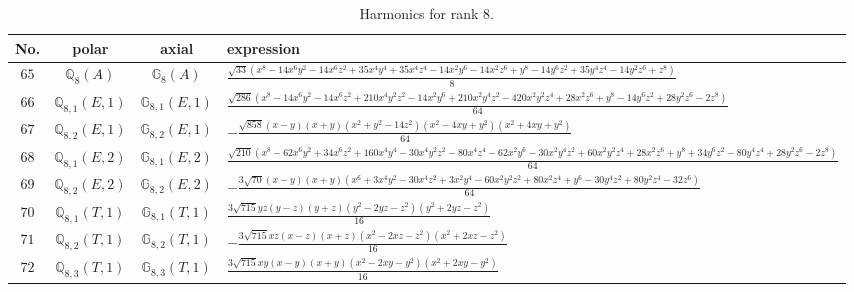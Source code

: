 \documentclass[fleqn,8pt,landscape]{jsarticle}
\begin{document}
\begin{table}[ht!]
\begin{center}
\caption{Harmonics for rank 8.}
\renewcommand{\arraystretch}{1.3}
\begin{tabular}{cccl} \hline \hline
No. & polar & axial & expression \\ \hline
$ 65 $ & $ \mathbb{Q}_{8}(A) $ & $ \mathbb{G}_{8}(A) $ & $ \frac{\sqrt{33} \left(x^{8} - 14 x^{6} y^{2} - 14 x^{6} z^{2} + 35 x^{4} y^{4} + 35 x^{4} z^{4} - 14 x^{2} y^{6} - 14 x^{2} z^{6} + y^{8} - 14 y^{6} z^{2} + 35 y^{4} z^{4} - 14 y^{2} z^{6} + z^{8}\right)}{8} $ \\
$ 66 $ & $ \mathbb{Q}_{8,1}(E,1) $ & $ \mathbb{G}_{8,1}(E,1) $ & $ \frac{\sqrt{286} \left(x^{8} - 14 x^{6} y^{2} - 14 x^{6} z^{2} + 210 x^{4} y^{2} z^{2} - 14 x^{2} y^{6} + 210 x^{2} y^{4} z^{2} - 420 x^{2} y^{2} z^{4} + 28 x^{2} z^{6} + y^{8} - 14 y^{6} z^{2} + 28 y^{2} z^{6} - 2 z^{8}\right)}{64} $ \\
$ 67 $ & $ \mathbb{Q}_{8,2}(E,1) $ & $ \mathbb{G}_{8,2}(E,1) $ & $ - \frac{\sqrt{858} \left(x - y\right) \left(x + y\right) \left(x^{2} + y^{2} - 14 z^{2}\right) \left(x^{2} - 4 x y + y^{2}\right) \left(x^{2} + 4 x y + y^{2}\right)}{64} $ \\
$ 68 $ & $ \mathbb{Q}_{8,1}(E,2) $ & $ \mathbb{G}_{8,1}(E,2) $ & $ \frac{\sqrt{210} \left(x^{8} - 62 x^{6} y^{2} + 34 x^{6} z^{2} + 160 x^{4} y^{4} - 30 x^{4} y^{2} z^{2} - 80 x^{4} z^{4} - 62 x^{2} y^{6} - 30 x^{2} y^{4} z^{2} + 60 x^{2} y^{2} z^{4} + 28 x^{2} z^{6} + y^{8} + 34 y^{6} z^{2} - 80 y^{4} z^{4} + 28 y^{2} z^{6} - 2 z^{8}\right)}{64} $ \\
$ 69 $ & $ \mathbb{Q}_{8,2}(E,2) $ & $ \mathbb{G}_{8,2}(E,2) $ & $ - \frac{3 \sqrt{70} \left(x - y\right) \left(x + y\right) \left(x^{6} + 3 x^{4} y^{2} - 30 x^{4} z^{2} + 3 x^{2} y^{4} - 60 x^{2} y^{2} z^{2} + 80 x^{2} z^{4} + y^{6} - 30 y^{4} z^{2} + 80 y^{2} z^{4} - 32 z^{6}\right)}{64} $ \\
$ 70 $ & $ \mathbb{Q}_{8,1}(T,1) $ & $ \mathbb{G}_{8,1}(T,1) $ & $ \frac{3 \sqrt{715} y z \left(y - z\right) \left(y + z\right) \left(y^{2} - 2 y z - z^{2}\right) \left(y^{2} + 2 y z - z^{2}\right)}{16} $ \\
$ 71 $ & $ \mathbb{Q}_{8,2}(T,1) $ & $ \mathbb{G}_{8,2}(T,1) $ & $ - \frac{3 \sqrt{715} x z \left(x - z\right) \left(x + z\right) \left(x^{2} - 2 x z - z^{2}\right) \left(x^{2} + 2 x z - z^{2}\right)}{16} $ \\
$ 72 $ & $ \mathbb{Q}_{8,3}(T,1) $ & $ \mathbb{G}_{8,3}(T,1) $ & $ \frac{3 \sqrt{715} x y \left(x - y\right) \left(x + y\right) \left(x^{2} - 2 x y - y^{2}\right) \left(x^{2} + 2 x y - y^{2}\right)}{16} $ \\

\end{tabular}
\end{center}
\end{table}
\end{document}
